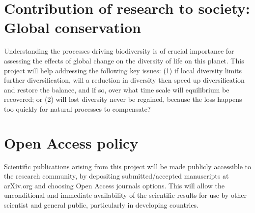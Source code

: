 \section{Contribution of research to society: Global conservation} 

Understanding the processes driving biodiversity is of crucial importance for assessing the effects of global change on the diversity of life on this planet. This project will help addressing the following key issues: (1) if local diversity limits further diversification, will a reduction in diversity then speed up diversification and restore the balance, and if so, over what time scale will equilibrium be recovered; or (2) will lost diversity never be regained, because the loss happens too quickly for natural processes to compensate?

\section{Open Access policy}

Scientific publications arising from this project will be made publicly accessible to the research community, by depositing submitted/accepted manuscripts at arXiv.org and choosing Open Access journals options. This will allow the unconditional and immediate availability of the scientific results for use by other scientist and general public, particularly in developing countries. 